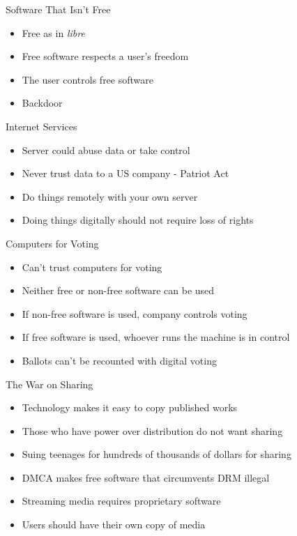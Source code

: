 \begin{frame}{Software That Isn't Free}
  \begin{itemize}
    \item Free as in {\it libre\/}
    \item Free software respects a user's freedom
    \item The user controls free software
    \item Backdoor
  \end{itemize}
\end{frame}

\begin{frame}{Internet Services}
  \begin{itemize}
    \item Server could abuse data or take control
    \item Never trust data to a US company - Patriot Act
    \item Do things remotely with your own server
    \item Doing things digitally should not require loss of rights
  \end{itemize}
\end{frame}

\begin{frame}{Computers for Voting}
  \begin{itemize}
    \item Can't trust computers for voting
    \item Neither free or non-free software can be used
    \item If non-free software is used, company controls voting
    \item If free software is used, whoever runs the machine is in control
    \item Ballots can't be recounted with digital voting
  \end{itemize}
\end{frame}

\begin{frame}{The War on Sharing}
  \begin{itemize}
    \item Technology makes it easy to copy published works
    \item Those who have power over distribution do not want sharing
    \item Suing teenages for hundreds of thousands of dollars for sharing
    \item DMCA makes free software that circumvents DRM illegal
    \item Streaming media requires proprietary software
    \item Users should have their own copy of media
  \end{itemize}
\end{frame}


